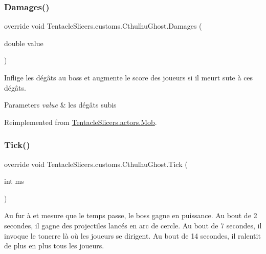 \subsubsection{\texorpdfstring{Damages()}{Damages()}}
{\footnotesize\ttfamily override void Tentacle\+Slicers.\+customs.\+Cthulhu\+Ghost.\+Damages (\begin{DoxyParamCaption}\item[{double}]{value }\end{DoxyParamCaption})\hspace{0.3cm}{\ttfamily [virtual]}}



Inflige les dégâts au boss et augmente le score des joueurs si il meurt sute à ces dégâts. 


\begin{DoxyParams}{Parameters}
{\em value} & les dégâts subis \\
\hline
\end{DoxyParams}


Reimplemented from \hyperlink{class_tentacle_slicers_1_1actors_1_1_mob_ac596097268c10f823e40533c869ced33}{Tentacle\+Slicers.\+actors.\+Mob}.

\mbox{\label{class_tentacle_slicers_1_1customs_1_1_cthulhu_ghost_a402aea79e343f8f5a1b153a143edf9fb}} 
\subsubsection{\texorpdfstring{Tick()}{Tick()}}
{\footnotesize\ttfamily override void Tentacle\+Slicers.\+customs.\+Cthulhu\+Ghost.\+Tick (\begin{DoxyParamCaption}\item[{int}]{ms }\end{DoxyParamCaption})\hspace{0.3cm}{\ttfamily [virtual]}}



Au fur à et mesure que le temps passe, le boss gagne en puissance. Au bout de 2 secondes, il gagne des projectiles lancés en arc de cercle. Au bout de 7 secondes, il invoque le tonerre là où les joueurs se dirigent. Au bout de 14 secondes, il ralentit de plus en plus tous les joueurs. 


